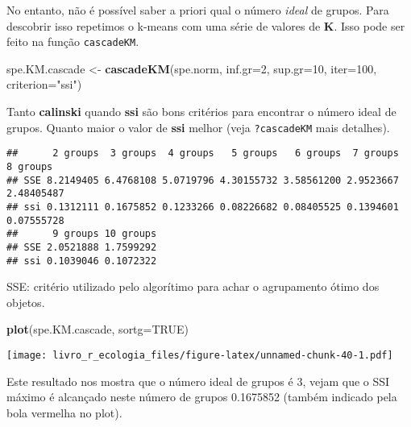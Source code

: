 \documentclass[
]{book}
\newenvironment{Shaded}{\begin{snugshade}}{\end{snugshade}}
\newcommand{\CommentTok}[1]{\textcolor[rgb]{0.56,0.35,0.01}{\textit{#1}}}
\newcommand{\DataTypeTok}[1]{\textcolor[rgb]{0.13,0.29,0.53}{#1}}
\newcommand{\DecValTok}[1]{\textcolor[rgb]{0.00,0.00,0.81}{#1}}
\newcommand{\KeywordTok}[1]{\textcolor[rgb]{0.13,0.29,0.53}{\textbf{#1}}}
\newcommand{\NormalTok}[1]{#1}
\newcommand{\OperatorTok}[1]{\textcolor[rgb]{0.81,0.36,0.00}{\textbf{#1}}}
\newcommand{\OtherTok}[1]{\textcolor[rgb]{0.56,0.35,0.01}{#1}}
\newcommand{\StringTok}[1]{\textcolor[rgb]{0.31,0.60,0.02}{#1}}
\begin{document}
No entanto, não é possível saber a priori qual o número \emph{ideal} de grupos. Para descobrir isso repetimos o k-means com uma série de valores de \textbf{K}. Isso pode ser feito na função \texttt{cascadeKM}.

\begin{Shaded}
\begin{Highlighting}[]
\NormalTok{spe.KM.cascade <-}\StringTok{ }\KeywordTok{cascadeKM}\NormalTok{(spe.norm, }\DataTypeTok{inf.gr=}\DecValTok{2}\NormalTok{, }\DataTypeTok{sup.gr=}\DecValTok{10}\NormalTok{, }\DataTypeTok{iter=}\DecValTok{100}\NormalTok{, }\DataTypeTok{criterion=}\StringTok{"ssi"}\NormalTok{) }
\end{Highlighting}
\end{Shaded}

Tanto \textbf{calinski} quando \textbf{ssi} são bons critérios para encontrar o número ideal de grupos. Quanto maior o valor de \textbf{ssi} melhor (veja \texttt{?cascadeKM} mais detalhes).

\begin{Shaded}
\end{Shaded}

\begin{verbatim}
##      2 groups  3 groups  4 groups   5 groups   6 groups  7 groups   8 groups
## SSE 8.2149405 6.4768108 5.0719796 4.30155732 3.58561200 2.9523667 2.48405487
## ssi 0.1312111 0.1675852 0.1233266 0.08226682 0.08405525 0.1394601 0.07555728
##      9 groups 10 groups
## SSE 2.0521888 1.7599292
## ssi 0.1039046 0.1072322
\end{verbatim}

SSE: critério utilizado pelo algorítimo para achar o agrupamento ótimo dos objetos.

\begin{Shaded}
\begin{Highlighting}[]
\KeywordTok{plot}\NormalTok{(spe.KM.cascade, }\DataTypeTok{sortg=}\OtherTok{TRUE}\NormalTok{)}
\end{Highlighting}
\end{Shaded}

\texttt{[image: livro\_r\_ecologia\_files/figure-latex/unnamed-chunk-40-1.pdf]}

Este resultado nos mostra que o número ideal de grupos é 3, vejam que o SSI máximo é alcançado neste número de grupos 0.1675852 (também indicado pela bola vermelha no plot).
\end{document}
